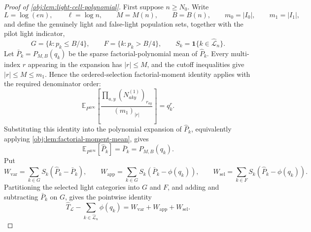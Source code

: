 \documentclass[11pt]{article}
\begin{document}
\begin{proof}[Proof of \cref{obj:lem:light-cell-polynomial}]
First suppose \(n\ge N_0\).  Write
\[
L=\log(en),\qquad \ell=\log n,\qquad M=M(n),\qquad B=B(n),
\qquad m_0=|I_0|,
\qquad m_1=|I_1|,
\]
and define the genuinely light and false-light population sets, together with the pilot light indicator,
\[
G=\{k:p_k\le B/4\},\qquad F=\{k:p_k>B/4\},
\qquad S_k=\mathbf 1\{k\in\widehat{\mathcal L}_n\}.
\]
Let \(\bar P_k=P_{M,B}(q_k)\) be the sparse factorial-polynomial mean of \(\widehat P_k\).  Every multi-index \(r\) appearing in the expansion has \(|r|\le M\), and the cutoff inequalities give \(|r|\le M\le m_1\).  Hence the ordered-selection factorial-moment identity applies with the required denominator order:
\[
\mathbb E_{P^{\otimes\infty}}
\left[
\frac{\prod_{a,y}(N^{(1)}_{aky})_{r_{ay}}}{(m_1)_{|r|}}
\right]
=q_k^r .
\]
Substituting this identity into the polynomial expansion of \(\widehat P_k\), equivalently applying \cref{obj:lem:factorial-moment-mean}, gives
\[
\mathbb E_{P^{\otimes\infty}}[\widehat P_k]
=\bar P_k
=P_{M,B}(q_k).
\]
Put
\[
W_{\mathrm{var}}=\sum_{k\in G}S_k(\widehat P_k-\bar P_k),\qquad
W_{\mathrm{app}}=\sum_{k\in G}S_k(\bar P_k-\phi(q_k)),\qquad
W_{\mathrm{sel}}=\sum_{k\in F}S_k(\widehat P_k-\phi(q_k)).
\]
Partitioning the selected light categories into \(G\) and \(F\), and adding and subtracting \(\bar P_k\) on \(G\), gives the pointwise identity
\[
\widehat T_{\mathcal L}
-
\sum_{k\in\widehat{\mathcal L}_n}\phi(q_k)
=
W_{\mathrm{var}}+W_{\mathrm{app}}+W_{\mathrm{sel}} .
\] %


\end{proof}
\end{document}

